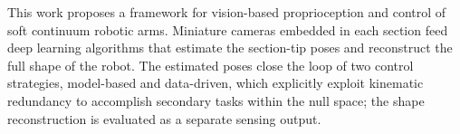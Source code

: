 This work proposes a framework for vision-based proprioception and control of soft continuum robotic arms. Miniature cameras embedded in each section feed deep learning algorithms that estimate the section-tip poses and reconstruct the full shape of the robot. The estimated poses close the loop of two control strategies, model-based and data-driven, which explicitly exploit kinematic redundancy to accomplish secondary tasks within the null space; the shape reconstruction is evaluated as a separate sensing output.

